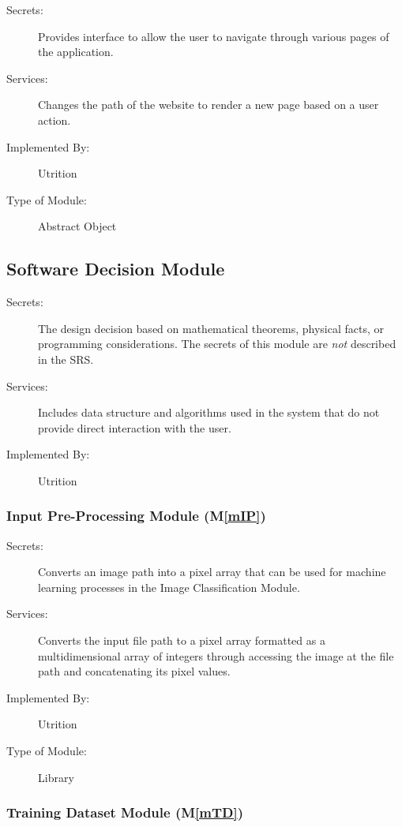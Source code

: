 \documentclass[12pt, titlepage]{article}
\newcommand{\mref}[1]{M\ref{#1}}
\begin{document}
\begin{description}
	\item[Secrets:]Provides interface to allow the user to navigate through various 
	pages of the application.
	\item[Services:]Changes the path of the website to render a new page based on a 
	user action.
	\item[Implemented By:] Utrition
	\item[Type of Module:] Abstract Object
\end{description}

\subsection{Software Decision Module}

\begin{description}
\item[Secrets:] The design decision based on mathematical theorems, physical
  facts, or programming considerations. The secrets of this module are
  \emph{not} described in the SRS.
\item[Services:] Includes data structure and algorithms used in the system that
  do not provide direct interaction with the user. 
\item[Implemented By:] Utrition
\end{description}

\subsubsection{Input Pre-Processing Module (\mref{mIP})}

\begin{description}
	\item[Secrets:] Converts an image path into a pixel array that can be used for machine learning processes in the Image Classification Module.
	\item[Services:] Converts the input file path to a pixel array formatted as a multidimensional array of integers through accessing the image at the file path and concatenating its pixel values.
	\item[Implemented By:] Utrition
	\item[Type of Module:] Library
\end{description}

\subsubsection{Training Dataset Module (\mref{mTD})}
\end{document}
